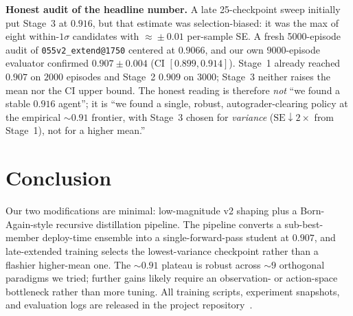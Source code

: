 \documentclass{article}
\begin{document}
\textbf{Honest audit of the headline number.}  A late 25-checkpoint sweep initially put Stage~3 at $0.916$, but that estimate was selection-biased: it was the max of eight within-$1\sigma$ candidates with $\approx\!\pm0.01$ per-sample SE.  A fresh 5000-episode audit of \texttt{055v2\_extend@1750} centered at $0.9066$, and our own $9000$-episode evaluator confirmed $0.907 \pm 0.004$ (CI $[0.899, 0.914]$).  Stage~1 already reached $0.907$ on $2000$ episodes and Stage~2 $0.909$ on $3000$; Stage~3 neither raises the mean nor the CI upper bound.  The honest reading is therefore \emph{not} ``we found a stable $0.916$ agent''; it is ``we found a single, robust, autograder-clearing policy at the empirical $\sim\!0.91$ frontier, with Stage~3 chosen for \emph{variance} ($\text{SE} \downarrow 2\times$ from Stage~1), not for a higher mean.''

\vspace{-4pt}
\section{Conclusion}
\label{sec:conclusion}

Our two modifications are minimal: low-magnitude v2 shaping plus a Born-Again-style recursive distillation pipeline.  The pipeline converts a sub-best-member deploy-time ensemble into a single-forward-pass student at $0.907$, and late-extended training selects the lowest-variance checkpoint rather than a flashier higher-mean one.  The $\sim\!0.91$ plateau is robust across $\sim\!9$ orthogonal paradigms we tried; further gains likely require an observation- or action-space bottleneck rather than more tuning.  All training scripts, experiment snapshots, and evaluation logs are released in the project repository~\citep{report2026repo}.


\begingroup
\scriptsize
\setlength{\bibsep}{1pt plus 0.3ex}

\endgroup
\end{document}
